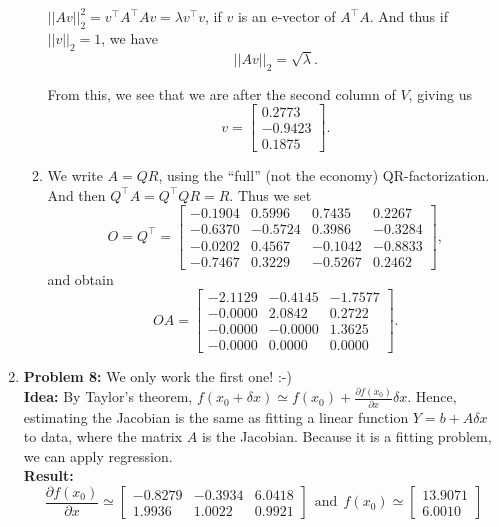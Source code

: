 \documentclass[letterpaper]{article}
\begin{document}
\begin{enumerate}
\begin{enumerate}
$||Av||_2^2 = v^\top A^\top A v = \lambda v^\top v$, if  $v$ is an e-vector of $A^\top A$. And thus if $||v||_2=1$, we have
$$||Av||_2 = \sqrt{\lambda}.$$

From this, we see that we are after the second column of $V$, giving us
$$v=\left[ \begin{array}{r}0.2773\\-0.9423\\0.1875\end{array} \right].$$

\item   We write $A=QR$, using the ``full'' (not the economy) QR-factorization. And then $Q^\top A = Q^\top Q R = R$. Thus we set
    $$O=Q^\top = \left[ \begin{array}{rrrr}-0.1904& 0.5996& 0.7435& 0.2267\\-0.6370& -0.5724& 0.3986& -0.3284\\-0.0202& 0.4567& -0.1042& -0.8833\\-0.7467& 0.3229& -0.5267& 0.2462\end{array} \right],$$
    and obtain
    $$O A = \left[ \begin{array}{rrr}-2.1129& -0.4145& -1.7577\\-0.0000& 2.0842& 0.2722\\-0.0000& -0.0000& 1.3625\\-0.0000& 0.0000& 0.0000\end{array} \right].$$

\end{enumerate}
\newpage

\item \noindent \textbf{Problem 8:} We only work the first one! :-) \\

 \textbf{Idea:} By Taylor's theorem, $f(x_0 + \delta x) \simeq f(x_0) + \frac{\partial f(x_0)}{\partial x} \delta x$. Hence, estimating the Jacobian is the same as fitting a linear function $Y = b + A \delta x$ to data, where the matrix $A$ is the Jacobian. Because it is a fitting problem, we can apply regression.\\

 \textbf{Result:} $$ \frac{\partial f(x_0)}{\partial x}  \simeq
 \left[ \begin{array}{rrr}-0.8279& -0.3934& 6.0418\\1.9936& 1.0022& 0.9921\end{array} \right] ~~\text{and}~~f(x_0) \simeq \left[ \begin{array}{r}13.9071\\6.0010\end{array} \right]$$


\end{enumerate}
\end{document}
